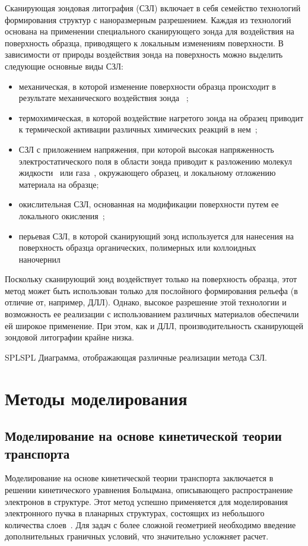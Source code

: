 Сканирующая зондовая литография (СЗЛ) включает в себя семейство технологий формирования структур с наноразмерным разрешением. Каждая из технологий основана на применении специального сканирующего зонда для воздействия на поверхность образца, приводящего к локальным изменениям поверхности. В зависимости от природы воздействия зонда на поверхность можно выделить следующие основные виды СЗЛ:
\begin{itemize}
	\item механическая, в которой изменение поверхности образца происходит в результате механического воздействия зонда ~\cite{SPL_mechanical};
	\item  термохимическая, в которой воздействие нагретого зонда на образец приводит к термической активации различных химических реакций в нем~\cite{SPL_termochemical};
	\item СЗЛ с приложением напряжения, при которой высокая напряженность электростатического поля в области зонда приводит к разложению молекул жидкости~\cite{SPL_bias_liquid} или газа~\cite{SPL_bias_gas}, окружающего образец, и локальному отложению материала на образце;
	\item окислительная СЗЛ, основанная на модификации поверхности путем ее локального окисления~\cite{SPL_oxidation};
	\item перьевая СЗЛ, в которой сканирующий зонд используется для нанесения на поверхность образца органических, полимерных или коллоидных наночернил~\cite{SPL_dip_pen_1, SPL_dip_pen_2}
\end{itemize}

Поскольку сканирующий зонд воздействует только на поверхность образца, этот метод может быть использован только для послойного формирования рельефа (в отличие от, например, ДЛЛ). Однако, высокое разрешение этой технологии и возможность ее реализации с использованием различных материалов обеспечили ей широкое применение. При этом, как и ДЛЛ, производительность сканирующей зондовой литографии крайне низка.

\begin{narrowfig}{SPL}{SPL}
	Диаграмма, отображающая различные реализации метода СЗЛ.
\end{narrowfig}


\section{Методы моделирования}

\subsection{Моделирование на основе кинетической теории транспорта}
Моделирование на основе кинетической теории транспорта заключается в решении кинетического уравнения Больцмана, описывающего распространение электронов в структуре. Этот метод успешно применяется для моделирования электронного пучка в планарных структурах, состоящих из небольшого количества слоев~\cite{Stepanova_2006, Stepanova_2010}. Для задач с более сложной геометрией необходимо введение дополнительных граничных условий, что значительно усложняет расчет.

